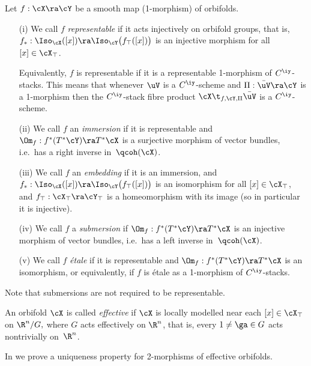 \documentclass{article}
\begin{document}
\begin{dfn} Let $f:\cX\ra\cY$ be a smooth map (1-morphism) of
orbifolds.
\begin{itemize}
\setlength{\itemsep}{0pt}
\setlength{\parsep}{0pt}
\item[(i)] We call $f$ {\it representable\/} if it acts
injectively on orbifold groups, that is, $f_*:\Iso_\cX([x])\ra
\Iso_\cY\bigl(f_\top([x])\bigr)$ is an injective morphism for
all~$[x]\in\cX_\top$.

Equivalently, $f$ is representable if it is a representable
1-morphism of $C^\iy$-stacks. This means that whenever $\uV$ is
a $C^\iy$-scheme and $\Pi:\bar\uV\ra\cY$ is a 1-morphism then
the $C^\iy$-stack fibre product $\cX\t_{f,\cY,\Pi}\bar\uV$ is a
$C^\iy$-scheme.
\item[(ii)] We call $f$ an {\it
immersion\/} if it is representable and
$\Om_f:f^*(T^*\cY)\ra T^*\cX$ is a surjective morphism of vector
bundles, i.e.\ has a right inverse in~$\qcoh(\cX)$.
\item[(iii)] We call $f$ an {\it
embedding\/} if it is an immersion, and
$f_*:\Iso_\cX([x])\ra\Iso_\cY \bigl(f_\top([x])\bigr)$ is an
isomorphism for all $[x]\in\cX_\top$, and
$f_\top:\cX_\top\ra\cY_\top$ is a homeomorphism with its image
(so in particular it is injective).
\item[(iv)] We call $f$ a {\it
submersion\/} if $\Om_f: f^*(T^*\cY)\ra
T^*\cX$ is an injective morphism of vector bundles, i.e.\ has a
left inverse in~$\qcoh(\cX)$.
\item[(v)] We call $f$ {\it \'etale\/} if it is representable and
$\Om_f: f^*(T^*\cY)\ra T^*\cX$ is an isomorphism, or
equivalently, if $f$ is \'etale as a 1-morphism of
$C^\iy$-stacks.
\end{itemize}
Note that submersions are not required to be representable.
\label{ds9def2}
\end{dfn}

\begin{dfn} An orbifold $\cX$ is called {\it
effective\/} if $\cX$ is locally modelled
near each $[x]\in\cX_\top$ on $\R^n/G,$ where $G$ acts effectively
on $\R^n$, that is, every $1\ne\ga\in G$ acts nontrivially
on~$\R^n$.
\label{ds9def3}
\end{dfn}

In \cite[\S 8.4]{Joyc6} we prove a uniqueness property for
2-morphisms of effective orbifolds.
\end{document}
